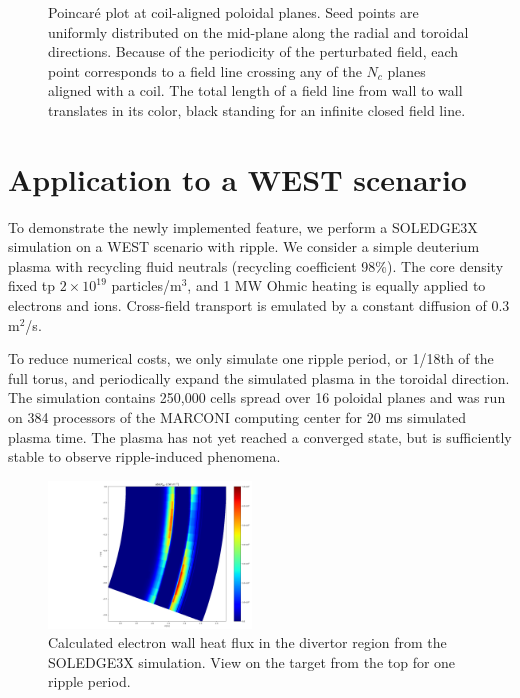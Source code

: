 \begin{figure}[H]
\begin{subfigure}[t]{0.49\textwidth}
		\label{fig:poincareXpt}
	\end{subfigure}
	\caption{Poincaré plot at coil-aligned poloidal planes. Seed points are uniformly distributed on the mid-plane along the radial and toroidal directions. Because of the periodicity of the perturbated field, each point corresponds to a field line crossing any of the $N_c$ planes aligned with a coil. The total length of a field line from wall to wall translates in its color, black standing for an infinite closed field line.}
	\label{fig:poincare}
\end{figure}




\section{Application to a WEST scenario}
To demonstrate the newly implemented feature, we perform a SOLEDGE3X simulation on a WEST scenario with ripple. We consider a simple deuterium plasma with recycling fluid neutrals (recycling coefficient 98\%). The core density fixed tp $2\times 10^{19}$ particles/m$^3$, and 1 MW Ohmic heating is equally applied to electrons and ions. Cross-field transport is emulated by a constant diffusion of $0.3$ m$^2$/s. \newline

To reduce numerical costs, we only simulate one ripple period, or 1/18th of the full torus, and periodically expand the simulated plasma in the toroidal direction. The simulation contains 250,000 cells spread over 16 poloidal planes and was run on 384 processors of the MARCONI computing center\cite{iannone2018marconi-fusion} for 20 ms simulated plasma time. The plasma has not yet reached a converged state, but is sufficiently stable to observe ripple-induced phenomena.

\begin{figure}[H]
	\centering
	\includegraphics[width=0.48\textwidth]{schemes/WESTripple_targetHeatFlux.png}
	\caption{Calculated electron wall heat flux in the divertor region from the SOLEDGE3X simulation. View on the target from the top for one ripple period.}
	\label{fig:target_S3X}
\end{figure}

